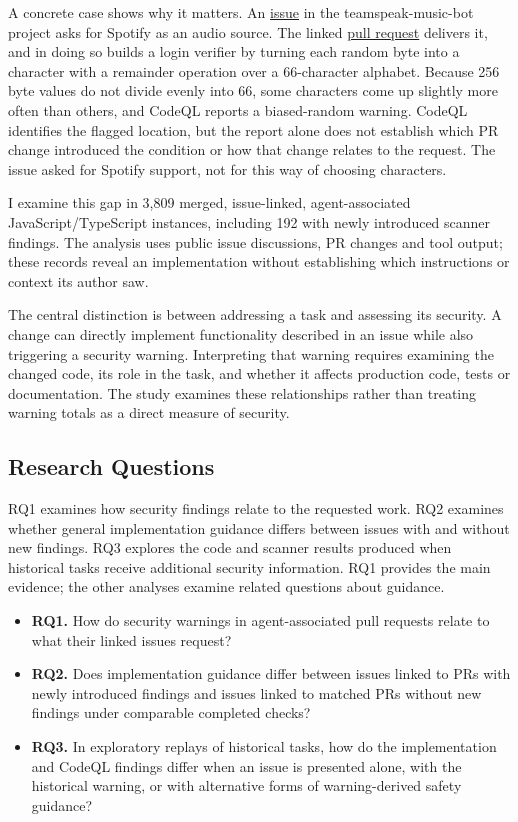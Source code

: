 \documentclass[acmsmall,screen,nonacm]{acmart}
\begin{document}
A concrete case shows why it matters. An \href{https://github.com/ZHANGTIANYAO1/teamspeak-music-bot/issues/112}{issue} in the teamspeak-music-bot project asks for Spotify as an audio source. The linked \href{https://github.com/ZHANGTIANYAO1/teamspeak-music-bot/pull/118}{pull request} delivers it, and in doing so builds a login verifier by turning each random byte into a character with a remainder operation over a 66-character alphabet. Because 256 byte values do not divide evenly into 66, some characters come up slightly more often than others, and CodeQL reports a biased-random warning. CodeQL identifies the flagged location, but the report alone does not establish which PR change introduced the condition or how that change relates to the request. The issue asked for Spotify support, not for this way of choosing characters.

I examine this gap in 3,809 merged, issue-linked, agent-associated JavaScript/\allowbreak TypeScript instances, including 192 with newly introduced scanner findings. The analysis uses public issue discussions, PR changes and tool output; these records reveal an implementation without establishing which instructions or context its author saw.

The central distinction is between addressing a task and assessing its security. A change can directly implement functionality described in an issue while also triggering a security warning. Interpreting that warning requires examining the changed code, its role in the task, and whether it affects production code, tests or documentation. The study examines these relationships rather than treating warning totals as a direct measure of security.


\subsection{Research Questions}\label{sec:rqs}

RQ1 examines how security findings relate to the requested work. RQ2 examines whether general implementation guidance differs between issues with and without new findings. RQ3 explores the code and scanner results produced when historical tasks receive additional security information. RQ1 provides the main evidence; the other analyses examine related questions about guidance.
\begin{itemize}
\item \textbf{RQ1.} How do security warnings in agent-associated pull requests relate to what their linked issues request?
\item \textbf{RQ2.} Does implementation guidance differ between issues linked to PRs with newly introduced findings and issues linked to matched PRs without new findings under comparable completed checks?
\item \textbf{RQ3.} In exploratory replays of historical tasks, how do the implementation and CodeQL findings differ when an issue is presented alone, with the historical warning, or with alternative forms of warning-derived safety guidance?
\end{itemize}
\end{document}
